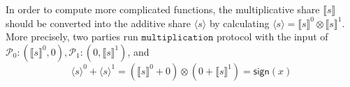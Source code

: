 \documentclass[letterpaper]{article} %
\begin{document}
    In order to compute more complicated functions,
    the multiplicative share $\llbracket s \rrbracket$ should be converted into the additive share $\langle s\rangle$
    by calculating $\langle s\rangle = \llbracket s \rrbracket ^{0}\otimes \llbracket s \rrbracket ^{1}$.
    More precisely, two parties run $\mathtt{multiplication}$ protocol with the input of
    $\mathcal{P}_{0}:(\llbracket s \rrbracket ^{0},0),\mathcal{P}_{1}:(0,\llbracket s \rrbracket ^{1})$, and
    $$ \langle s\rangle^{0} +\langle s\rangle^{1}=(\llbracket s \rrbracket ^{0}+0)\otimes (0+\llbracket s \rrbracket ^{1})=\mathsf{sign}(x)$$
\end{document}
